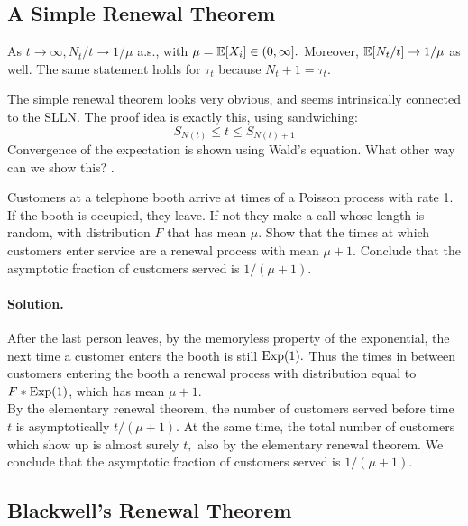 \documentclass[12pt]{article}
\begin{document}
\subsection{A Simple Renewal Theorem}

\begin{theorem}
    As $t \rightarrow \infty, N_t/t \rightarrow 1/\mu$ a.s., with $\mu = \mathbb{E}[X_i] \in (0,\infty].$ Moreover, $\mathbb{E}[N_t/t] \rightarrow 1/\mu$ as well. The same statement holds for $\tau_t$ because $N_t + 1 = \tau_t$.
\end{theorem}

The simple renewal theorem looks very obvious, and seems intrinsically connected to the SLLN. The proof idea is exactly this, using sandwiching:
\[
S_{N(t)} \leq t \leq S_{N(t) + 1}
\]
Convergence of the expectation is shown using Wald's equation. What other way can we show this? .


\begin{exercise}
    Customers at a telephone booth arrive at times of a Poisson process with rate 1. If the booth is occupied, they leave. If not they make a call whose length is random, with distribution $F$ that has mean $\mu$. Show that the times at which customers enter service are a renewal process with mean $\mu + 1$. Conclude that the asymptotic fraction of customers served is $1/(\mu+1).$

    \paragraph{Solution.} After the last person leaves, by the memoryless property of the exponential, the next time  a customer enters the booth is still $\operatorname{Exp}(1).$ Thus the times in between customers entering the booth a renewal process with distribution equal to $F * \operatorname{Exp}(1)$, which has mean $\mu + 1.$\\

By the elementary renewal theorem, the number of customers served before time $t$ is asymptotically $t/(\mu+1)$. At the same time, the total number of customers which show up is almost surely $t,$ also by the elementary renewal theorem. We conclude that the asymptotic fraction of customers served is $1/(\mu+1).$
\end{exercise}

\subsection{Blackwell's Renewal Theorem}
\end{document}
